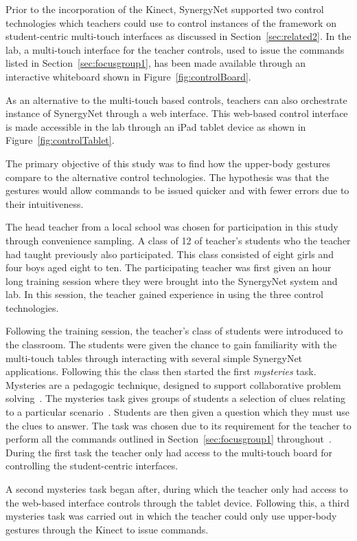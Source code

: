 \documentclass[manuscript, review, screen]{acmart}
\begin{document}
Prior to the incorporation of the Kinect, SynergyNet supported two control technologies which teachers could use to control instances of the framework on student-centric multi-touch interfaces as discussed in Section~\ref{sec:related2}.
In the lab, a multi-touch interface for the teacher controls, used to issue the commands listed in Section~\ref{sec:focusgroup1}, has been made available through an interactive whiteboard shown in Figure~\ref{fig:controlBoard}.

As an alternative to the multi-touch based controls, teachers can also orchestrate instance of SynergyNet through a web interface.
This web-based control interface is made accessible in the lab through an iPad tablet device as shown in Figure~\ref{fig:controlTablet}.

The primary objective of this study was to find how the upper-body gestures compare to the alternative control technologies.
The hypothesis was that the gestures would allow commands to be issued quicker and with fewer errors due to their intuitiveness.

The head teacher from a local school was chosen for participation in this study through convenience sampling.
A class of 12 of teacher's students who the teacher had taught previously also participated.
This class consisted of eight girls and four boys aged eight to ten.
The participating teacher was first given an hour long training session where they were brought into the SynergyNet system and lab.  
In this session, the teacher gained experience in using the three control technologies.

Following the training session, the teacher's class of students were introduced to the classroom.
The students were given the chance to gain familiarity with the multi-touch tables through interacting with several simple SynergyNet applications.
Following this the class then started the first \textit{mysteries} task.
Mysteries are a pedagogic technique, designed to support collaborative problem solving~\cite{Leat2002}.
The mysteries task gives groups of students a selection of clues relating to a particular scenario~\cite{Higgins2011b}.
Students are then given a question which they must use the clues to answer.
The task was chosen due to its requirement for the teacher to perform all the commands outlined in Section~\ref{sec:focusgroup1} throughout~\cite{Mercier2012}.
During the first task the teacher only had access to the multi-touch board for controlling the student-centric interfaces.

A second mysteries task began after, during which the teacher only had access to the web-based interface controls through the tablet device.
Following this, a third mysteries task was carried out in which the teacher could only use upper-body gestures through the Kinect to issue commands.
\end{document}
